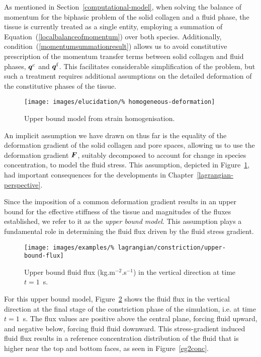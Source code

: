 As mentioned in Section~\ref{computational-model}, when solving the
balance of momentum for the biphasic problem of the solid collagen and
a fluid phase, the tissue is currently treated as a single entity,
employing a summation of Equation~(\ref{localbalanceofmomentum}) over
both species. Additionally, condition~(\ref{momentumsummationresult})
allows us to avoid constitutive prescription of the momentum transfer
terms between solid collagen and fluid phases, $\mbox{\boldmath$ q$}^\mathrm{c}$ and
$\mbox{\boldmath$ q$}^\mathrm{f}$. This facilitates considerable simplification of the
problem, but such a treatment requires additional assumptions on the
detailed deformation of the constitutive phases of the tissue.

\begin{figure}[!hpt]
  \centering
  \texttt{[image: images/elucidation/\%
    homogeneous-deformation]}
  \caption{Upper bound model from strain homogenisation.}
  \label{upper-bound-model}
\end{figure}

An implicit assumption we have drawn on thus far is the equality of
the deformation gradient of the solid collagen and pore spaces,
allowing us to use the deformation gradient $\mbox{\boldmath$ F$}$, suitably decomposed
to account for change in species concentration, to model the fluid
stress. This assumption, depicted in Figure~\ref{upper-bound-model},
had important consequences for the developments in
Chapter~\ref{lagrangian-perspective}.

Since the imposition of a common deformation gradient results in an
upper bound for the effective stiffness of the tissue and magnitudes
of the fluxes established, we refer to it as the {\em upper bound
  model}. This assumption plays a fundamental role in determining the
fluid flux driven by the fluid stress gradient.

\begin{figure}[!hpt]
  \centering
  \texttt{[image: images/examples/\%
    lagrangian/constriction/upper-bound-flux]}
  \caption{Upper bound fluid flux (kg.m$^{-2}$.s$^{-1}$) in
    the vertical direction at time $t=1$~s.}
  \label{eg2flux}
\end{figure}

\noindent For this upper bound model, Figure~\ref{eg2flux} shows the
fluid flux in the vertical direction at the final stage of the
constriction phase of the simulation, i.e. at time $t=1$~s. The flux
values are positive above the central plane, forcing fluid upward, and
negative below, forcing fluid fluid downward. This stress-gradient
induced fluid flux results in a reference concentration distribution
of the fluid that is higher near the top and bottom faces, as seen in
Figure~\ref{eg2conc}.

